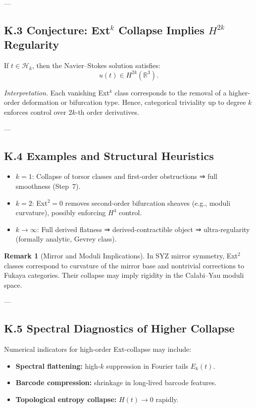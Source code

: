 \documentclass[11pt]{article}
\theoremstyle{definition}
\newtheorem{remark}[theorem]{Remark}
\begin{document}
---

\subsection*{K.3 Conjecture: Ext$^k$ Collapse Implies $H^{2k}$ Regularity}

\begin{conjecture}
If \( t \in \mathcal{H}_k \), then the Navier--Stokes solution satisfies:
\[
u(t) \in H^{2k}(\mathbb{R}^3).
\]
\end{conjecture}

\textit{Interpretation.}  
Each vanishing Ext$^k$ class corresponds to the removal of a higher-order deformation or bifurcation type.  
Hence, categorical triviality up to degree \( k \) enforces control over \( 2k \)-th order derivatives.

---

\subsection*{K.4 Examples and Structural Heuristics}

\begin{itemize}
  \item \( k = 1 \): Collapse of torsor classes and first-order obstructions ⇒ full smoothness (Step~7).
  \item \( k = 2 \): Ext$^2 = 0$ removes second-order bifurcation sheaves (e.g., moduli curvature), possibly enforcing $H^4$ control.
  \item \( k \to \infty \): Full derived flatness ⇒ derived-contractible object ⇒ ultra-regularity (formally analytic, Gevrey class).
\end{itemize}

\begin{remark}[Mirror and Moduli Implications]
In SYZ mirror symmetry, Ext$^2$ classes correspond to curvature of the mirror base and nontrivial corrections to Fukaya categories.  
Their collapse may imply rigidity in the Calabi--Yau moduli space.
\end{remark}

---

\subsection*{K.5 Spectral Diagnostics of Higher Collapse}

Numerical indicators for high-order Ext-collapse may include:
\begin{itemize}
  \item \textbf{Spectral flattening:} high-$k$ suppression in Fourier tails \( E_k(t) \).
  \item \textbf{Barcode compression:} shrinkage in long-lived barcode features.
  \item \textbf{Topological entropy collapse:} \( H(t) \to 0 \) rapidly.
\end{itemize}
\end{document}
